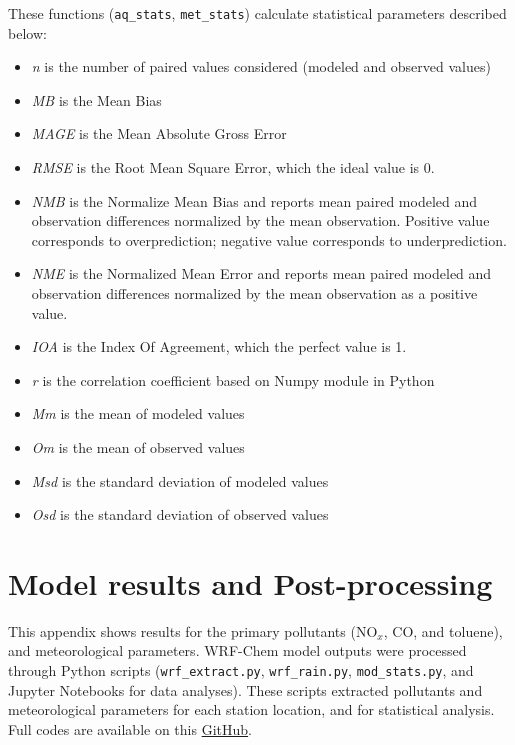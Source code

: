   These functions (\verb|aq_stats|, \verb|met_stats|) calculate statistical parameters described below:
  
  \begin{itemize}
  	\item \textit{n} is the number of paired values considered (modeled and observed values)
  	\item \textit{MB} is the Mean Bias
  	\item \textit{MAGE} is the Mean Absolute Gross Error
  	\item \textit{RMSE} is the Root Mean Square Error, which the ideal value is 0.
  	\item \textit{NMB} is the Normalize Mean Bias and reports mean paired modeled and observation differences normalized by the mean observation. Positive value corresponds to overprediction; negative value corresponds to underprediction.
  	\item \textit{NME} is the Normalized Mean Error and reports mean paired modeled and observation differences normalized by the mean observation as a positive value.
  	\item \textit{IOA} is the Index Of Agreement, which the perfect value is 1.
  	\item \textit{r} is the correlation coefficient based on Numpy module in Python
  	\item \textit{Mm} is the mean of modeled values
  	\item \textit{Om} is the mean of observed values
  	\item \textit{Msd} is the standard deviation of modeled values
  	\item \textit{Osd} is the standard deviation of observed values
  \end{itemize}
  
  \chapter{Model results and Post-processing}\label{ap:res}
  This appendix shows results for the primary pollutants (NO$_x$, CO, and toluene), and meteorological parameters.
  WRF-Chem model outputs were processed through Python scripts (\verb|wrf_extract.py|, \verb|wrf_rain.py|, \verb|mod_stats.py|, and Jupyter Notebooks for data analyses).
  These scripts extracted pollutants and meteorological parameters for each station location, and for statistical analysis.
  Full codes are available on this \href{https://github.com/adelgadop/Master_dissertation/tree/main/04_wrfchem_scripts}{GitHub}.
  
